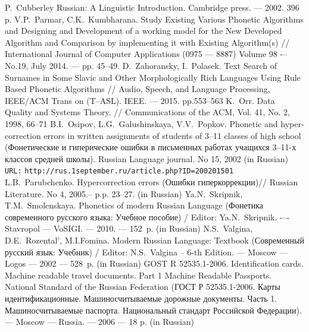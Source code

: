 \documentclass[conference,a4paper]{IEEEtran}
\providecommand\url[1]{\texttt{#1}}
\begin{document}
%
%
%
\begin{thebibliography}{11}

 P.~Cubberley Russian: A Linguistic Introduction. Cambridge press. --– 2002. 396 p.
	V.P.~Parmar, C.K.~Kumbharana. Study Existing Various Phonetic Algorithms and Designing and Development of a working model for the New Developed Algorithm and Comparison by implementing it with Existing Algorithm(s) // International Journal of Computer Applications (0975 –-- 8887) Volume 98 -– No.19, July 2014. --– pp. 45--49.
 D.~Zahoransky, I.~Polasek. Text Search of Surnames in Some Slavic and Other Morphologically Rich Languages Using Rule Based Phonetic Algorithms // Audio, Speech, and Language Processing, IEEE/ACM Trans on (T--ASL). IEEE. --– 2015. pp.553--563
 K.~Orr. Data Quality and Systems Theory. // Communications of the ACM, Vol. 41, No. 2, 1998, 66--71
	B.I.~Osipov, L.G.~Galushinskaya, V.V.~Popkov. Phonetic and hyper-correction errors in written assignments of students of 3--11 classes of high school (Фонетические и гиперические ошибки в письменных работах учащихся 3–11-х классов средней школы). Russian Language journal. No 15, 2002 (in Russian) \texttt{URL:} \url{http://rus.1september.ru/article.php?ID=200201501}
 L.B.~Parubchenko. Hypercorrection errors (Ошибки гиперкоррекции)// Russian Literature. No 4, 2005.-- p.p. 23--27. (in Russian)
 Ya.N.~Skripnik, T.M.~Smolenskaya. Phonetics of modern Russian Language (Фонетика современного русского языка: Учебное пособие) / Editor: Ya.N.~Skripnik. -–- Stavropol --- VoSIGI. --- 2010. --– 152~p. (in Russian)
 N.S.~Valgina, D.E.~Rozental', M.I.Fomina. Modern Russian Language: Textbook (Современный русский язык: Учебник) / Editor: N.S.~Valgina -- 6-th Edition. --- Moscow --- Logos --- 2002 --– 528~p. (in Russian)
 GOST R 52535.1-2006. Identification cards. Machine readable travel documents. Part 1 Machine Readable Passports. National Standard of the Russian Federation (ГОСТ Р 52535.1-2006. Карты идентификационные. Машиносчитываемые дорожные документы. Часть 1. Машиносчитываемые паспорта. Национальный стандарт Российской Федерации). --- Moscow --- Russia. --- 2006 --- 18 p. (in Russian)

\end{thebibliography}
\end{document}
